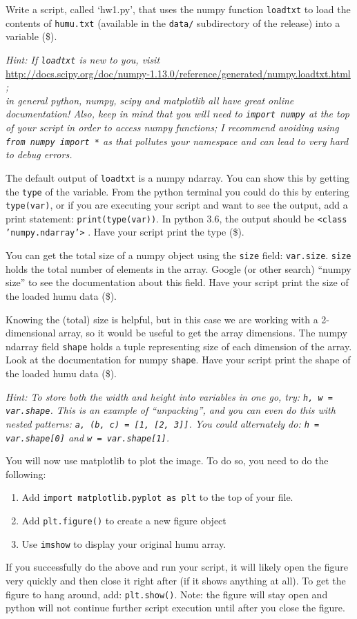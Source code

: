 \documentclass[10pt]{article}
\begin{document}
\begin{enumerate}
Write a script, called `hw1.py', that uses the numpy function {\tt loadtxt} to load the contents of {\tt humu.txt} (available in the {\tt data/} subdirectory of the release) into a variable (\$).

{\em Hint: If {\tt loadtxt} is new to you, visit} \\
\url{http://docs.scipy.org/doc/numpy-1.13.0/reference/generated/numpy.loadtxt.html} {\em ; \\ in general python, numpy, scipy and matplotlib all have great online documentation!  Also, keep in mind that you will need to {\tt import numpy} at the top of your script in order to access numpy functions; I recommend avoiding using {\tt from numpy import *} as that pollutes your namespace and can lead to very hard to debug errors. }

The default output of {\tt loadtxt} is a numpy ndarray.  You can show this by getting the {\tt type} of the variable.  From the python terminal you could do this by entering {\tt type(var)}, or if you are executing your script and want to see the output, add a print statement: {\tt print(type(var))}.  In python 3.6, the output should be {\tt <class 'numpy.ndarray'>} .  Have your script print the type (\$).

You can get the total size of a numpy object using the {\tt size} field: {\tt var.size}.  {\tt size} holds the total number of elements in the array.  Google (or other search) ``numpy size'' to see the documentation about this field.  Have your script print the size of the loaded humu data (\$).

Knowing the (total) size is helpful, but in this case we are working with a 2-dimensional array, so it would be useful to get the array dimensions.  The numpy ndarray field {\tt shape} holds a tuple representing size of each dimension of the array.  Look at the documentation for numpy {\tt shape}.  Have your script print the shape of the loaded humu data (\$).

{\em Hint: To store both the width and height into variables in one go, try: {\tt h, w = var.shape}.  This is an example of ``unpacking'', and you can even do this with nested patterns: {\tt a, (b, c) = [1, [2, 3]]}.  You could alternately do: {\tt h = var.shape[0]} and {\tt w = var.shape[1]}.}

You will now use matplotlib to plot the image.  To do so, you need to do the following:
\begin{enumerate}
\item Add {\tt import matplotlib.pyplot as plt} to the top of your file.
\item Add {\tt plt.figure()} to create a new figure object
\item Use {\tt imshow} to display your original humu array.
\end{enumerate}
If you successfully do the above and run your script, it will likely open the figure very quickly and then close it right after (if it shows anything at all).  To get the figure to hang around, add: {\tt plt.show()}.  Note: the figure will stay open and python will not continue further script execution until after you close the figure.


\end{enumerate}
\end{document}
